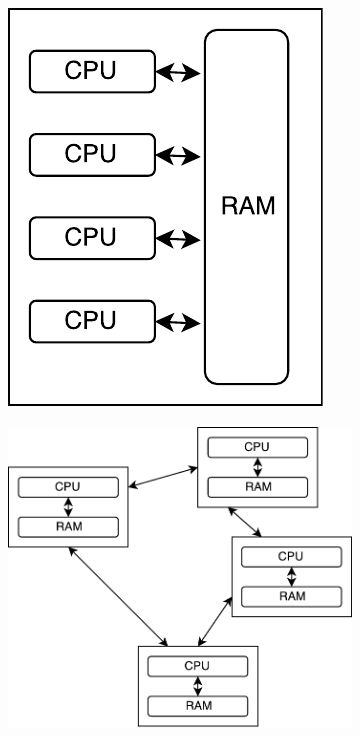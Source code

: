 \begin{figure}[h]
	\centering
	\begin{subfigure}{0.4\textwidth}
		\centering
		\includegraphics[scale=0.6]{parallel.pdf}
		\subcaption{\label{subfigure_a}}
	\end{subfigure}
	\begin{subfigure}{0.5\textwidth}
		\centering
		\includegraphics[scale=0.5]{distributed.pdf}
		\subcaption{\label{subfigure_b}}
	\end{subfigure}
	\begin{subfigure}{0.6\textwidth}

\end{subfigure}
\end{figure}
